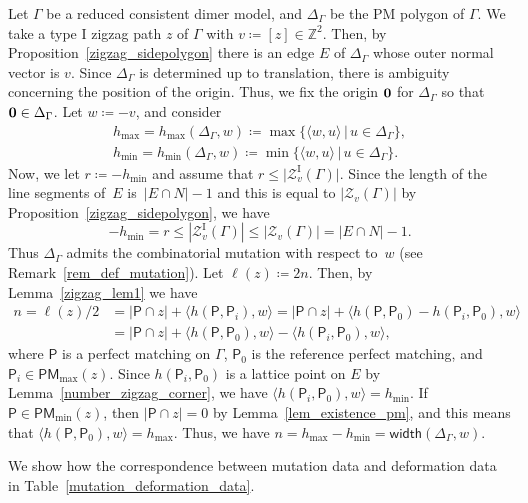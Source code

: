 \documentclass[pdftex]{sigma}%
\numberwithin{equation}{section}
\numberwithin{figure}{section}
\numberwithin{table}{section}
\newcommand{\ZZ}{\mathbb{Z}}
\newcommand{\rmI}{\mathrm{I}}
\newcommand{\calZ}{\mathcal{Z}}
\newcommand{\sfP}{\mathsf{P}}
\newcommand{\PM}{\mathsf{PM}}
\newcommand{\width}{\mathsf{width}}
\begin{document}
\begin{setting}
\label{mutation_deformation_setting}
Let $\Gamma$ be a reduced consistent dimer model, and $\Delta_\Gamma$ be the PM polygon of $\Gamma$.
We take a type I zigzag path $z$ of $\Gamma$ with $v\coloneqq [z]\in\ZZ^2$. Then, by Proposition~\ref{zigzag_sidepolygon}
there is an edge $E$ of $\Delta_\Gamma$ whose outer normal vector is $v$.
Since $\Delta_\Gamma$ is determined up to translation, there is ambiguity concerning the position of the origin.
Thus, we fix the origin ${\bf 0}$ for $\Delta_\Gamma$ so that ${\bf 0}\in\Delta_\Gamma$.
Let $w\coloneqq -v$, and consider
\begin{gather*}
h_{\max}= h_{\max}(\Delta_\Gamma,w)\coloneqq{\max}\{\langle w,u\rangle \,|\, u\in \Delta_\Gamma\},
\\
h_{\min}= h_{\min}(\Delta_\Gamma,w)\coloneqq{\min}\{\langle w,u\rangle \,|\, u\in \Delta_\Gamma\}.
\end{gather*}
Now, we let $r\coloneqq-h_{\min}$ and assume that $r\le\big|\calZ_v^\rmI(\Gamma)\big|$.
Since the length of the line segments of~$E$ is~$|E\cap N|-1$ and this is equal to $|\calZ_v(\Gamma)|$ by Proposition~\ref{zigzag_sidepolygon}, we have
\begin{displaymath}
-h_{\min}=r\le|\calZ_v^\rmI(\Gamma)|\le|\calZ_v(\Gamma)|=|E\cap N|-1.
\end{displaymath}
Thus $\Delta_\Gamma$ admits the combinatorial mutation with respect to~$w$ (see Remark~\ref{rem_def_mutation}).
Let $\ell(z)\coloneqq2n$. Then, by Lemma~\ref{zigzag_lem1} we have
\begin{align*}
n=\ell(z)/2&=|\sfP\cap z|+\langle h(\sfP,\sfP_i),w\rangle =|\sfP\cap z|+\langle h(\sfP,\sfP_0)-h(\sfP_i,\sfP_0),w\rangle\\
&=|\sfP\cap z|+\langle h(\sfP,\sfP_0),w\rangle-\langle h(\sfP_i,\sfP_0),w\rangle,
\end{align*}
where $\sfP$ is a perfect matching on $\Gamma$, $\sfP_0$ is the reference perfect matching, and $\sfP_i\in\PM_{\max}(z)$.
Since $h(\sfP_i,\sfP_0)$ is a lattice point on $E$ by Lemma~\ref{number_zigzag_corner}, we have $\langle h(\sfP_i,\sfP_0),w\rangle=h_{\min}$.
If $\sfP\in\PM_{\min}(z)$, then $|\sfP\cap z|=0$ by Lemma~\ref{lem_existence_pm}, and this means that $\langle h(\sfP,\sfP_0),w\rangle=h_{\max}$.
Thus, we have $n=h_{\max}-h_{\min}=\width(\Delta_\Gamma,w)$.


We show how the correspondence between mutation data and deformation data in Table~\ref{mutation_deformation_data}.


\end{setting}
\end{document}
